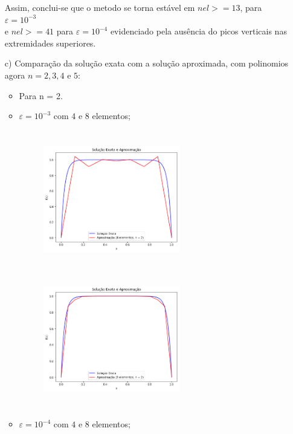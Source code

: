 \documentclass{article}
\begin{document}
\begin{itemize}
Assim, conclui-se que o metodo se torna estável em $nel>=13$, para $\varepsilon = 10^{-3}$\\
e $nel>=41$ para $\varepsilon = 10^{-4}$ evidenciado pela ausência do picos verticais nas extremidades superiores.

\newpage

\item[c)] Comparação da solução exata com a solução aproximada, com polinomios agora $n=2,3,4$ e $5$:
\begin{itemize}
\item Para n = 2.
\item $\varepsilon = 10^{-3}$ com $4$ e $8$ elementos;

\begin{figure}[!htb]
\centering
\includegraphics [width=6cm,height=6cm]{LetraC/4el_n2_e10-3.png}
\includegraphics [width=6cm,height=6cm]{LetraC/8el_n2_e10-3.png}
\end{figure}

\item $\varepsilon = 10^{-4}$ com $4$ e $8$ elementos;


\end{itemize}
\end{itemize}
\end{document}
